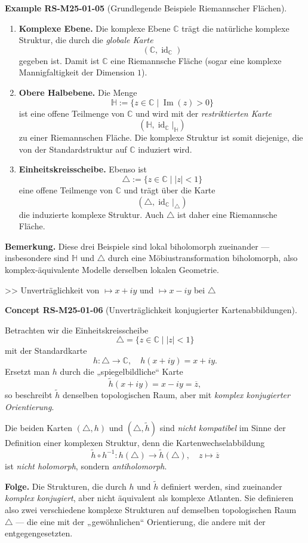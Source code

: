 \documentclass[10pt, letterpaper]{article}
\newcommand{\CustomHeading}[3]{%
  \par\medskip\noindent%
  \textbf{#1 #2} \textnormal{(#3)}.\enskip%
}
\newenvironment{EXA}[2]{\begin{unitbox}\CustomHeading{Example}{#1}{#2}}{\end{unitbox}}
\newenvironment{CONC}[2]{\begin{unitbox}\CustomHeading{Concept}{#1}{#2}}{\end{unitbox}}
\begin{document}
\begin{EXA}{RS-M25-01-05}{Grundlegende Beispiele Riemannscher Flächen}
\begin{enumerate}
\item \textbf{Komplexe Ebene.}  
Die komplexe Ebene $\mathbb{C}$ trägt die natürliche komplexe Struktur, die durch die \emph{globale Karte}
\[
(\mathbb{C}, \operatorname{id}_{\mathbb{C}})
\]
gegeben ist. Damit ist $\mathbb{C}$ eine Riemannsche Fläche (sogar eine komplexe Mannigfaltigkeit der Dimension $1$).

\item \textbf{Obere Halbebene.}  
Die Menge
\[
\mathbb{H} := \{ z \in \mathbb{C} \mid \operatorname{Im}(z) > 0 \}
\]
ist eine offene Teilmenge von $\mathbb{C}$ und wird mit der \emph{restriktierten Karte}
\[
(\mathbb{H}, \operatorname{id}_{\mathbb{C}}|_{\mathbb{H}})
\]
zu einer Riemannschen Fläche. Die komplexe Struktur ist somit diejenige, die von der Standardstruktur auf $\mathbb{C}$ induziert wird.

\item \textbf{Einheitskreisscheibe.}  
Ebenso ist
\[
\triangle := \{ z \in \mathbb{C} \mid |z| < 1 \}
\]
eine offene Teilmenge von $\mathbb{C}$ und trägt über die Karte
\[
(\triangle, \operatorname{id}_{\mathbb{C}}|_{\triangle})
\]
die induzierte komplexe Struktur. Auch $\triangle$ ist daher eine Riemannsche Fläche.
\end{enumerate}
\textbf{Bemerkung.}  
Diese drei Beispiele sind lokal biholomorph zueinander — insbesondere sind $\mathbb{H}$ und $\triangle$ durch eine Möbiustransformation biholomorph, also komplex-äquivalente Modelle derselben lokalen Geometrie.
\end{EXA}



>> Unverträglichkeit von $\mapsto x+iy$ und $\mapsto x-iy$ bei $\triangle$


\begin{CONC}{RS-M25-01-06}{Unverträglichkeit konjugierter Kartenabbildungen}
Betrachten wir die Einheitskreisscheibe 
\[
\triangle = \{ z \in \mathbb{C} \mid |z| < 1 \}
\]
mit der Standardkarte 
\[
h : \triangle \to \mathbb{C}, \quad h(x + i y) = x + i y.
\]
Ersetzt man $h$ durch die „spiegelbildliche“ Karte
\[
\tilde{h}(x + i y) = x - i y = \overline{z},
\]
so beschreibt $\tilde{h}$ denselben topologischen Raum, aber mit \emph{komplex konjugierter Orientierung}.  

Die beiden Karten $(\triangle, h)$ und $(\triangle, \tilde{h})$ sind \emph{nicht kompatibel} im Sinne der Definition einer komplexen Struktur, denn die Kartenwechselabbildung
\[
\tilde{h} \circ h^{-1} : h(\triangle) \to \tilde{h}(\triangle), 
\quad z \longmapsto \overline{z}
\]
ist \emph{nicht holomorph}, sondern \emph{antiholomorph}.  

\textbf{Folge.}  
Die Strukturen, die durch $h$ und $\tilde{h}$ definiert werden, sind zueinander \emph{komplex konjugiert}, aber nicht äquivalent als komplexe Atlanten.  
Sie definieren also zwei verschiedene komplexe Strukturen auf demselben topologischen Raum~$\triangle$ — die eine mit der „gewöhnlichen“ Orientierung, die andere mit der entgegengesetzten.
\end{CONC}
\end{document}
